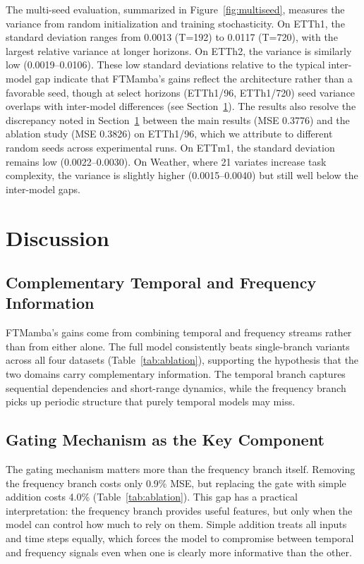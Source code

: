 \documentclass[symmetry,article,submit,pdftex,moreauthors]{Definitions/mdpi}
\begin{document}
The multi-seed evaluation, summarized in Figure~\ref{fig:multiseed}, measures the variance from random initialization and training stochasticity. On ETTh1, the standard deviation ranges from 0.0013 (T=192) to 0.0117 (T=720), with the largest relative variance at longer horizons. On ETTh2, the variance is similarly low (0.0019--0.0106). These low standard deviations relative to the typical inter-model gap indicate that FTMamba's gains reflect the architecture rather than a favorable seed, though at select horizons (ETTh1/96, ETTh1/720) seed variance overlaps with inter-model differences (see Section~\ref{sec:discussion}). The results also resolve the discrepancy noted in Section~\ref{sec:discussion} between the main results (MSE 0.3776) and the ablation study (MSE 0.3826) on ETTh1/96, which we attribute to different random seeds across experimental runs. On ETTm1, the standard deviation remains low (0.0022--0.0030). On Weather, where 21 variates increase task complexity, the variance is slightly higher (0.0015--0.0040) but still well below the inter-model gaps.

\section{Discussion}\label{sec:discussion}

\subsection{Complementary Temporal and Frequency Information}

FTMamba's gains come from combining temporal and frequency streams rather than from either alone. The full model consistently beats single-branch variants across all four datasets (Table~\ref{tab:ablation}), supporting the hypothesis that the two domains carry complementary information. The temporal branch captures sequential dependencies and short-range dynamics, while the frequency branch picks up periodic structure that purely temporal models may miss.

\subsection{Gating Mechanism as the Key Component}

The gating mechanism matters more than the frequency branch itself. Removing the frequency branch costs only 0.9\% MSE, but replacing the gate with simple addition costs 4.0\% (Table~\ref{tab:ablation}). This gap has a practical interpretation: the frequency branch provides useful features, but only when the model can control how much to rely on them. Simple addition treats all inputs and time steps equally, which forces the model to compromise between temporal and frequency signals even when one is clearly more informative than the other.
\end{document}
